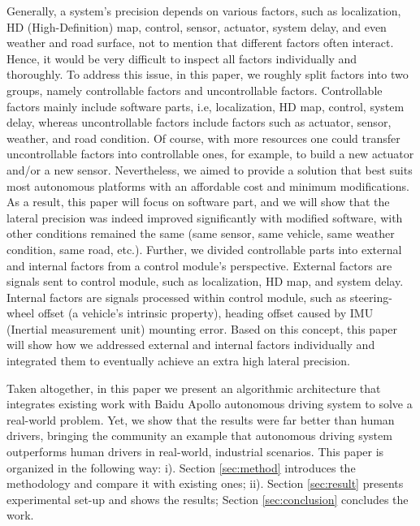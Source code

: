 \documentclass[letterpaper, 10 pt, conference]{ieeeconf}
\begin{document}
Generally, a system's precision depends on various factors, such as localization, HD (High-Definition) map, control, sensor, actuator, system delay, and even weather and road surface, not to mention that different factors often interact. Hence, it would be very difficult to inspect all factors individually and thoroughly. 
To address this issue, in this paper, we roughly split factors into two groups, namely controllable factors and uncontrollable factors. 
Controllable factors mainly include software parts, i.e, localization, HD map, control, system delay, whereas uncontrollable factors include factors such as actuator, sensor, weather, and road condition. Of course, with more resources one could transfer uncontrollable factors into controllable ones, for example, to build a new actuator and/or a new sensor. 
Nevertheless, we aimed to provide a solution that best suits most autonomous platforms with an affordable cost and minimum modifications. As a result, this paper will focus on software part, and we will show that the lateral precision was indeed improved significantly with modified software, with other conditions remained the same (same sensor, same vehicle, same weather condition, same road, etc.). Further, we divided controllable parts into external and internal factors from a control module's perspective. External factors are signals sent to control module, such as localization, HD map, and system delay. Internal factors are signals processed within control module, such as steering-wheel offset (a vehicle's intrinsic property), heading offset caused by IMU (Inertial measurement unit) mounting error. Based on this concept, this paper will show how we addressed external and internal factors individually and integrated them to eventually achieve an extra high lateral precision.

Taken altogether, in this paper we present an algorithmic architecture that integrates existing work with Baidu Apollo autonomous driving system \cite{Apollo2017, Fan2018} to solve a real-world problem. Yet, we show that the results were far better than human drivers, bringing the community an example that autonomous driving system outperforms human drivers in real-world, industrial scenarios. 
This paper is organized in the following way: i). Section \ref{sec:method} introduces the methodology and compare it with existing ones; ii). Section \ref{sec:result} presents experimental set-up and shows the results; Section \ref{sec:conclusion} concludes the work. 

\end{document}
